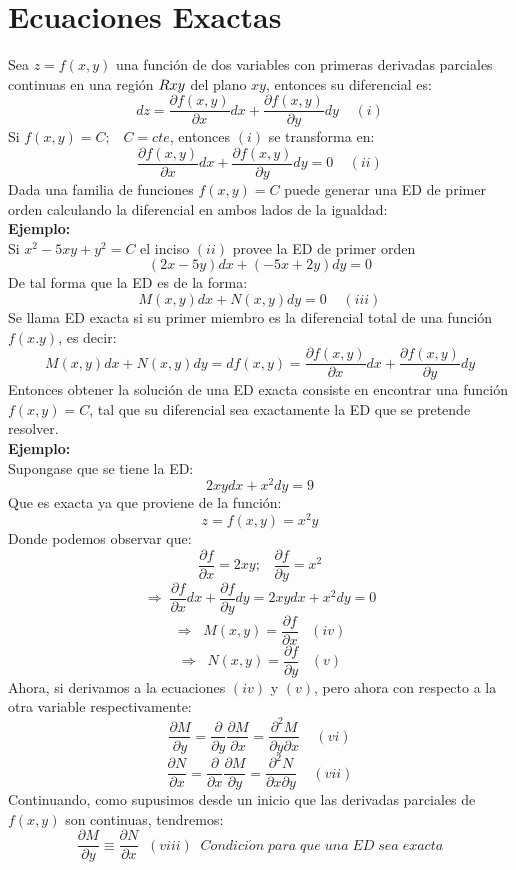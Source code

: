 \documentclass[10pt,executivepaper]{article}
\begin{document}
\section{Ecuaciones Exactas}
Sea $z=f(x,y)$ una función de dos variables con primeras derivadas parciales continuas en una región $R\tiny{xy}$ del plano $xy$, entonces su diferencial es:
\[dz=\frac{\partial{f(x,y)}}{\partial{x}}dx+\frac{\partial{f(x,y)}}{\partial{y}}dy\;\;\;\;(i)\]
Si $f(x,y)=C;\;\;\;C=cte$, entonces $(i)$ se transforma en:
\[\frac{\partial{f(x,y)}}{\partial{x}}dx+\frac{\partial{f(x,y)}}{\partial{y}}dy=0\;\;\;\;(ii)\]
Dada una familia de funciones $f(x,y)=C$ puede generar una ED de primer orden calculando la diferencial en ambos lados de la igualdad:
\\
\textbf{Ejemplo:}
\\
Si $x^{2}-5xy+y^{2}=C$ el inciso $(ii)$ provee la ED de primer orden
\[(2x-5y)dx+(-5x+2y)dy=0\]
De tal forma que la ED es de la forma:
\[M(x,y)dx+N(x,y)dy=0\;\;\;\;(iii)\]
Se llama ED exacta si su primer miembro es la diferencial total de una función $f(x.y)$, es decir:
\[M(x,y)dx+N(x,y)dy=df(x,y)=\frac{\partial{f(x,y)}}{\partial{x}}dx+\frac{\partial{f(x,y)}}{\partial{y}}dy\]
Entonces obtener la solución de una ED exacta consiste en encontrar una función $f(x,y)=C$, tal que su diferencial sea exactamente la ED que se pretende resolver.
\\
\textbf{Ejemplo:}
\\
Supongase que se tiene la ED:
\[2xydx+x^{2}dy=9\]
Que es exacta ya que proviene de la función:
\[z=f(x,y)=x^{2}y\]
Donde podemos observar que:
\[\frac{\partial{f}}{\partial{x}}=2xy;\;\;\;\frac{\partial{f}}{\partial{y}}=x^{2}\]
\[\Rightarrow\;\frac{\partial{f}}{\partial{x}}dx+\frac{\partial{f}}{\partial{y}}dy=2xydx+x^{2}dy=0\]
\[\Rightarrow\;\;M(x,y)=\frac{\partial{f}}{\partial{x}}\;\;\;(iv)\]
\[\Rightarrow\;\;N(x,y)=\frac{\partial{f}}{\partial{y}}\;\;\;(v)\]
Ahora, si derivamos a la ecuaciones $(iv)$ y $(v)$, pero ahora con respecto a la otra variable respectivamente:
\[\frac{\partial{M}}{\partial{y}}=\frac{\partial}{\partial{y}}\frac{\partial{M}}{\partial{x}}=\frac{\partial^{2}{M}}{\partial{y}\partial{x}}\;\;\;\;(vi)\]
\[\frac{\partial{N}}{\partial{x}}=\frac{\partial}{\partial{x}}\frac{\partial{M}}{\partial{y}}=\frac{\partial^{2}{N}}{\partial{x}\partial{y}}\;\;\;\;(vii)\]
Continuando, como supusimos desde un inicio que las derivadas parciales de $f(x,y)$ son continuas, tendremos:
\[\frac{\partial{M}}{\partial{y}}\equiv \frac{\partial{N}}{\partial{x}}\;\;(viii)\;\;Condici\acute{o}n\;para\;que\;una\;ED\;sea\;exacta\]
\end{document}
